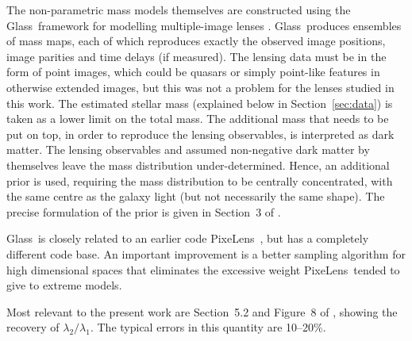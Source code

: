 \documentclass[useAMS,usenatbib]{mn2e}
\def\Glass{{\sc Glass}}
\def\PixeLens{{\sc PixeLens}}
\begin{document}
The non-parametric mass models themselves are constructed using the \Glass\ framework for modelling multiple-image lenses \citep{2014MNRAS.445.2181C}. \Glass\ produces ensembles of mass maps, each of which reproduces exactly the observed image positions, image parities and time delays (if measured). The lensing data must be in the form of point images, which could be quasars or simply point-like features in otherwise extended images, but this was not a problem for the lenses studied in this work. The estimated stellar mass (explained below in Section~\ref{sec:data}) is taken as a lower limit on the total mass. The additional mass that needs to be put on top, in order to reproduce the lensing observables, is interpreted as dark matter. The lensing observables and assumed non-negative dark matter by themselves leave the mass distribution under-determined. Hence, an additional prior is used, requiring the mass distribution to be centrally concentrated, with the same centre as the galaxy light (but not necessarily the same shape). The precise formulation of the prior is given in Section~3 of \citet{2014MNRAS.445.2181C} \citep[alternatively, for a more intuitive account of \Glass\ see Section~3.2 of][]{2015MNRAS.447.2170K}.

\Glass\ is closely related to an earlier code \PixeLens\ \citep{2004AJ....127.2604S,2008ApJ...679...17C}, but has a completely different code base. An important improvement is a better sampling algorithm for high dimensional spaces \citep{2012MNRAS.425.3077L} that eliminates the excessive weight \PixeLens\ tended to give to extreme models.

Most relevant to the present work are Section~5.2 and Figure~8 of
\citet{2014MNRAS.445.2181C}, showing the recovery of
$\lambda_2/\lambda_1$.  The typical errors in this quantity are
10--20\%.
\end{document}

